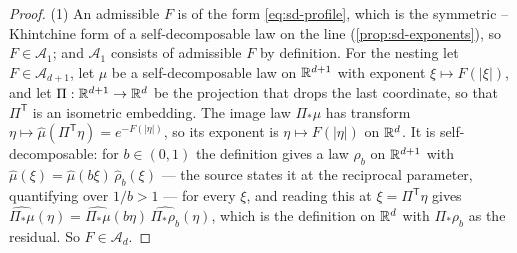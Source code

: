 \begin{proof}
(1) An admissible $F$ is of the form \ref{eq:sd-profile}, which is the symmetric
\Levy--Khintchine form of a self-decomposable law on the line (\ref{prop:sd-exponents}), so
$F \in \mathcal{A}_1$; and $\mathcal{A}_1$ consists of admissible $F$ by definition. For the
nesting let $F \in \mathcal{A}_{d+1}$, let $\mu$ be a self-decomposable law on $\mathbb{R}^{d+1}$ with
exponent $\xi \mapsto F(|\xi|)$, and let $\Pi : \mathbb{R}^{d+1} \to \mathbb{R}^d$ be the projection that
drops the last coordinate, so that $\Pi^{\mathsf T}$ is an isometric embedding. The image law
$\Pi_*\mu$ has transform $\eta \mapsto \hat\mu(\Pi^{\mathsf T}\eta) = e^{-F(|\eta|)}$, so its
exponent is $\eta \mapsto F(|\eta|)$ on $\mathbb{R}^d$. It is self-decomposable: for $b \in (0,1)$ the
definition gives a law $\rho_b$ on $\mathbb{R}^{d+1}$ with $\hat\mu(\xi) = \hat\mu(b\xi)\,\hat\rho_b(\xi)$
--- the source states it at the reciprocal parameter, quantifying over $1/b > 1$ ---
for every $\xi$, and reading this at $\xi = \Pi^{\mathsf T}\eta$ gives
$\widehat{\Pi_*\mu}(\eta) = \widehat{\Pi_*\mu}(b\eta)\,\widehat{\Pi_*\rho_b}(\eta)$, which is the
definition on $\mathbb{R}^d$ with $\Pi_*\rho_b$ as the residual. So $F \in \mathcal{A}_d$.


\end{proof}
